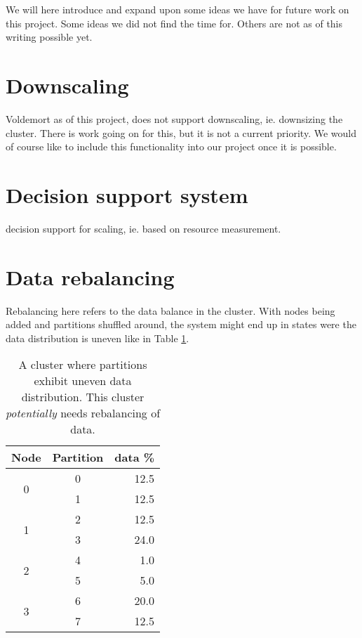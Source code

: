 
We will here introduce and expand upon some ideas we have for future work on this project. Some ideas we did not find the time for. Others are not as of this writing possible yet.

\section{Downscaling}
Voldemort as of this project, does not support downscaling, ie. downsizing the cluster. There is work going on for this, but it is not a current priority. We would of course like to include this functionality into our project once it is possible.


\section{Decision support system}
decision support for scaling, ie. based on resource measurement.

\section{Data rebalancing}
Rebalancing here refers to the data balance in the cluster. With nodes being added and partitions shuffled around, the system might end up in states were the data distribution is uneven like in Table \ref{tbl:datarebalance}.
\begin{center}
\begin{table}[h]
	\begin{tabular}{|c|c|r|}

		\multicolumn{1}{c}{Node} & 
		\multicolumn{1}{c}{Partition } & 
		\multicolumn{1}{c}{data \%} \\
		\hline

		\multirow{2}{*}{0} & 0 & 12.5 \\ \cline{2-3}
		 & 1 & 12.5 \\
		 \hline
		\multirow{2}{*}{1} & 2 & 12.5 \\ \cline{2-3}
		 & 3 & 24.0 \\
 		 \hline

		\multirow{2}{*}{2} & 4 & 1.0 \\ \cline{2-3}
		 & 5 & 5.0 \\
		
		\hline	
		
		\multirow{2}{*}{3} & 6 & 20.0 \\ \cline{2-3}
		 & 7 & 12.5 \\

		\hline
	\end{tabular}
	\caption{A cluster where partitions exhibit uneven data distribution. This cluster \emph{potentially} needs rebalancing of data.}
	\label{tbl:datarebalance}
\end{table}
\end{center}

